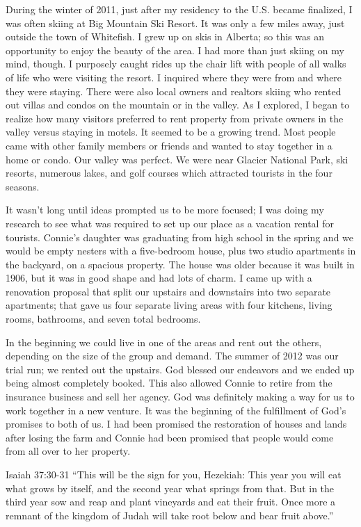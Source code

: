 \documentclass[twoside, 12pt]{book}
\begin{document}
During the winter of 2011, just after my residency to the U.S. became finalized, I was often skiing at Big Mountain Ski Resort. It was only a few miles away, just outside the town of Whitefish. I grew up on skis in Alberta; so this was an opportunity to enjoy the beauty of the area. I had more than just skiing on my mind, though. I purposely caught rides up the chair lift with people of all walks of life who were visiting the resort. I inquired where they were from and where they were staying. There were also local owners and realtors skiing who rented out villas and condos on the mountain or in the valley. As I explored, I began to realize how many visitors preferred to rent property from private owners in the valley versus staying in motels. It seemed to be a growing trend. Most people came with other family members or friends and wanted to stay together in a home or condo. Our valley was perfect. We were near Glacier National Park, ski resorts, numerous lakes, and golf courses which attracted tourists in the four seasons.

It wasn’t long until ideas prompted us to be more focused; I was doing my research to see what was required to set up our place as a vacation rental for tourists. Connie’s daughter was graduating from high school in the spring and we would be empty nesters with a five-bedroom house, plus two studio apartments in the backyard, on a spacious property. The house was older because it was built in 1906, but it was in good shape and had lots of charm. I came up with a renovation proposal that split our upstairs and downstairs into two separate apartments; that gave us four separate living areas with four kitchens, living rooms, bathrooms, and seven total bedrooms. 

In the beginning we could live in one of the areas and rent out the others, depending on the size of the group and demand. The summer of 2012 was our trial run; we rented out the upstairs. God blessed our endeavors and we ended up being almost completely booked. This also allowed Connie to retire from the insurance business and sell her agency. God was definitely making a way for us to work together in a new venture. It was the beginning of the fulfillment of God’s promises to both of us. I had been promised the restoration of houses and lands after losing the farm and Connie had been promised that people would come from all over to her property. 

Isaiah 37:30-31 “This will be the sign for you, Hezekiah: This year you will eat what grows by itself, and the second year what springs from that. But in the third year sow and reap and plant vineyards and eat their fruit. Once more a remnant of the kingdom of Judah will take root below and bear fruit above.”
\end{document}

